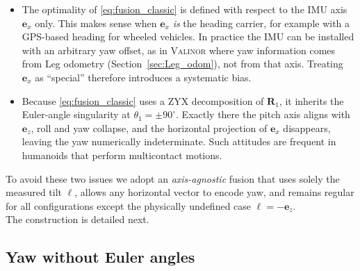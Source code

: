 \documentclass[10pt,twocolumn]{ICCAS}
\begin{document}
\begin{itemize} 
\item The optimality of \eqref{eq:fusion_classic} is defined with
      respect to the IMU axis $\boldsymbol{e}_{x}$ only.  
      This makes sense when $\boldsymbol{e}_{x}$ \emph{is} the heading
      carrier, for example with a GPS-based heading for wheeled vehicles.  
      In practice the IMU can be installed with an arbitrary yaw
      offset, as in {\scshape{Valinor}} where yaw information comes from Leg odometry
      (Section~\ref{sec:Leg_odom}), not from
      that axis.  Treating $\boldsymbol{e}_{x}$ as ``special'' therefore
      introduces a systematic bias.

\item Because \eqref{eq:fusion_classic} uses a ZYX decomposition of
      $\boldsymbol{R}_{1}$, it inherits the Euler-angle singularity at
      $\theta_{1}= \pm 90^{\circ}$.  
      Exactly there the pitch axis aligns with
      $\boldsymbol{e}_{z}$, roll and yaw collapse, and the horizontal
      projection of $\boldsymbol{e}_{x}$ disappears, leaving the yaw
      numerically indeterminate.  
      Such attitudes are frequent in humanoids that perform
      multicontact motions.
\end{itemize}
To avoid these two issues we adopt an \emph{axis-agnostic} fusion that
uses solely the measured tilt $\boldsymbol{\ell}$, allows any horizontal
vector to encode yaw, and remains regular for all configurations except
the physically undefined case $\boldsymbol{\ell}=-\boldsymbol{e}_{z}$.\\
The construction is detailed next.

\subsection{Yaw without Euler angles}
\label{sec:yaw_no_euler}
\end{document}

